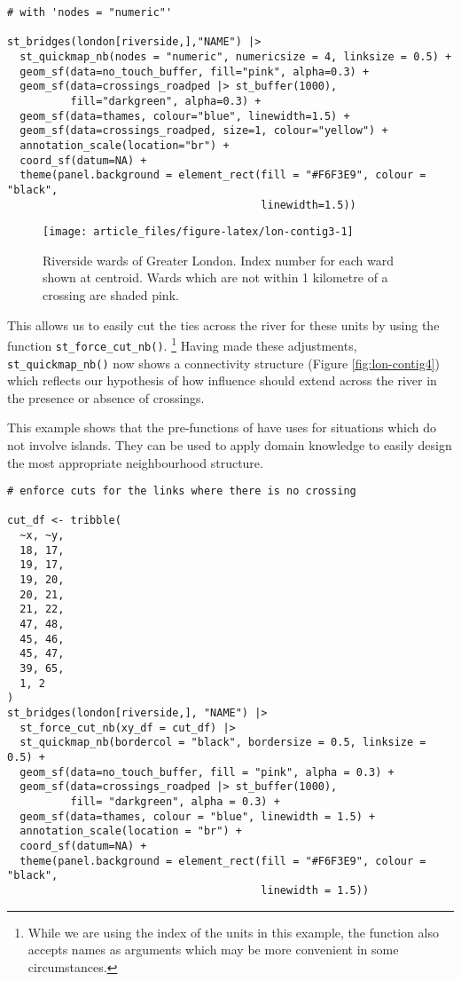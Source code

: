 \begin{verbatim}
# with 'nodes = "numeric"'

st_bridges(london[riverside,],"NAME") |> 
  st_quickmap_nb(nodes = "numeric", numericsize = 4, linksize = 0.5) +
  geom_sf(data=no_touch_buffer, fill="pink", alpha=0.3) + 
  geom_sf(data=crossings_roadped |> st_buffer(1000), 
          fill="darkgreen", alpha=0.3) +
  geom_sf(data=thames, colour="blue", linewidth=1.5) + 
  geom_sf(data=crossings_roadped, size=1, colour="yellow") + 
  annotation_scale(location="br") +
  coord_sf(datum=NA) + 
  theme(panel.background = element_rect(fill = "#F6F3E9", colour = "black", 
                                        linewidth=1.5))
\end{verbatim}

\begin{figure}

{\centering \texttt{[image: article\_files/figure-latex/lon-contig3-1]} 

}

\caption{Riverside wards of Greater London. Index number for each ward shown at centroid. Wards which are not within 1 kilometre of a crossing are shaded pink. }\label{fig:lon-contig3}
\end{figure}

This allows us to easily cut the ties across the river for these units by using the function \texttt{st\_force\_cut\_nb()}. \footnote{While we are using the index of the units in this example, the function also
  accepts names as arguments which may be more convenient in some circumstances.} Having made these adjustments,
\texttt{st\_quickmap\_nb()} now shows a connectivity structure (Figure \ref{fig:lon-contig4}) which reflects our hypothesis of how influence should extend across the river in the presence or absence of crossings.

This example shows that the pre-functions of  have uses for situations which do not involve islands. They can be used to apply domain knowledge to easily design the most appropriate neighbourhood structure.

\begin{verbatim}
# enforce cuts for the links where there is no crossing

cut_df <- tribble(
  ~x, ~y,
  18, 17,
  19, 17,
  19, 20,
  20, 21,
  21, 22,
  47, 48,
  45, 46,
  45, 47,
  39, 65,
  1, 2
)
st_bridges(london[riverside,], "NAME") |> 
  st_force_cut_nb(xy_df = cut_df) |> 
  st_quickmap_nb(bordercol = "black", bordersize = 0.5, linksize = 0.5) +
  geom_sf(data=no_touch_buffer, fill = "pink", alpha = 0.3) + 
  geom_sf(data=crossings_roadped |> st_buffer(1000), 
          fill= "darkgreen", alpha = 0.3) +
  geom_sf(data=thames, colour = "blue", linewidth = 1.5) +
  annotation_scale(location = "br") +
  coord_sf(datum=NA) + 
  theme(panel.background = element_rect(fill = "#F6F3E9", colour = "black", 
                                        linewidth = 1.5))
\end{verbatim}

